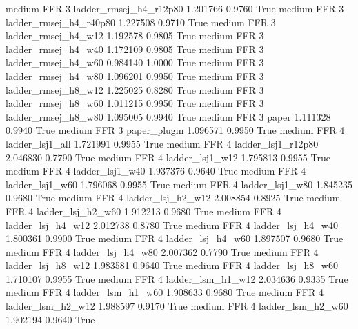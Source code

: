     medium      FFR                 3 ladder_rmsej_h4_r12p80   1.201766      0.9760    True
    medium      FFR                 3 ladder_rmsej_h4_r40p80   1.227508      0.9710    True
    medium      FFR                 3    ladder_rmsej_h4_w12   1.192578      0.9805    True
    medium      FFR                 3    ladder_rmsej_h4_w40   1.172109      0.9805    True
    medium      FFR                 3    ladder_rmsej_h4_w60   0.984140      1.0000    True
    medium      FFR                 3    ladder_rmsej_h4_w80   1.096201      0.9950    True
    medium      FFR                 3    ladder_rmsej_h8_w12   1.225025      0.8280    True
    medium      FFR                 3    ladder_rmsej_h8_w60   1.011215      0.9950    True
    medium      FFR                 3    ladder_rmsej_h8_w80   1.095005      0.9940    True
    medium      FFR                 3                  paper   1.111328      0.9940    True
    medium      FFR                 3           paper_plugin   1.096571      0.9950    True
    medium      FFR                 4        ladder_lsj1_all   1.721991      0.9955    True
    medium      FFR                 4     ladder_lsj1_r12p80   2.046830      0.7790    True
    medium      FFR                 4        ladder_lsj1_w12   1.795813      0.9955    True
    medium      FFR                 4        ladder_lsj1_w40   1.937376      0.9640    True
    medium      FFR                 4        ladder_lsj1_w60   1.796068      0.9955    True
    medium      FFR                 4        ladder_lsj1_w80   1.845235      0.9680    True
    medium      FFR                 4      ladder_lsj_h2_w12   2.008854      0.8925    True
    medium      FFR                 4      ladder_lsj_h2_w60   1.912213      0.9680    True
    medium      FFR                 4      ladder_lsj_h4_w12   2.012738      0.8780    True
    medium      FFR                 4      ladder_lsj_h4_w40   1.800361      0.9900    True
    medium      FFR                 4      ladder_lsj_h4_w60   1.897507      0.9680    True
    medium      FFR                 4      ladder_lsj_h4_w80   2.007362      0.7790    True
    medium      FFR                 4      ladder_lsj_h8_w12   1.983581      0.9640    True
    medium      FFR                 4      ladder_lsj_h8_w60   1.710107      0.9955    True
    medium      FFR                 4      ladder_lsm_h1_w12   2.034636      0.9335    True
    medium      FFR                 4      ladder_lsm_h1_w60   1.908633      0.9680    True
    medium      FFR                 4      ladder_lsm_h2_w12   1.988597      0.9170    True
    medium      FFR                 4      ladder_lsm_h2_w60   1.902194      0.9640    True
